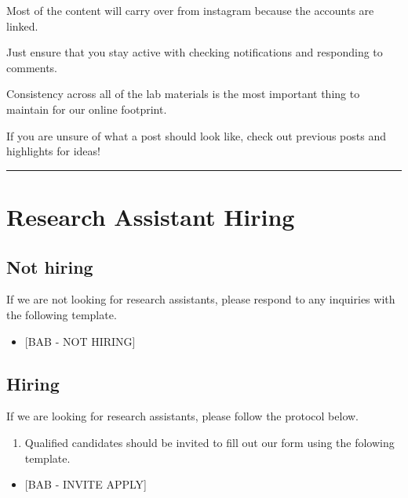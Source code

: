 \documentclass[]{book}
\providecommand{\tightlist}{%
  \setlength{\itemsep}{0pt}\setlength{\parskip}{0pt}}
\begin{document}
Most of the content will carry over from instagram because the accounts are linked.

Just ensure that you stay active with checking notifications and responding to comments.

Consistency across all of the lab materials is the most important thing to maintain for our online footprint.

If you are unsure of what a post should look like, check out previous posts and highlights for ideas!

\begin{center}\rule{0.5\linewidth}{\linethickness}\end{center}

\hypertarget{research-assistant-hiring}{%
\section{Research Assistant Hiring}\label{research-assistant-hiring}}

\hypertarget{not-hiring}{%
\subsection{Not hiring}\label{not-hiring}}

If we are not looking for research assistants, please respond to any inquiries with the following template.

\begin{itemize}
\tightlist
\item
  {[}BAB - NOT HIRING{]}
\end{itemize}

\hypertarget{hiring}{%
\subsection{Hiring}\label{hiring}}

If we are looking for research assistants, please follow the protocol below.

\begin{enumerate}
\def\labelenumi{\arabic{enumi}.}
\tightlist
\item
  Qualified candidates should be invited to fill out our form using the folowing template.
\end{enumerate}

\begin{itemize}
\tightlist
\item
  {[}BAB - INVITE APPLY{]}
\end{itemize}
\end{document}
